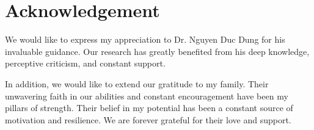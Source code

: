 \chapter*{Acknowledgement}

We would like to express my appreciation to Dr. Nguyen Duc Dung for his invaluable guidance. Our research has greatly benefited from his deep knowledge, perceptive criticism, and constant support.

\noindent In addition, we would like to extend our gratitude to my family. Their unwavering faith in our abilities and constant encouragement have been my pillars of strength. Their belief in my potential has been a constant source of motivation and resilience. We are forever grateful for their love and support.
